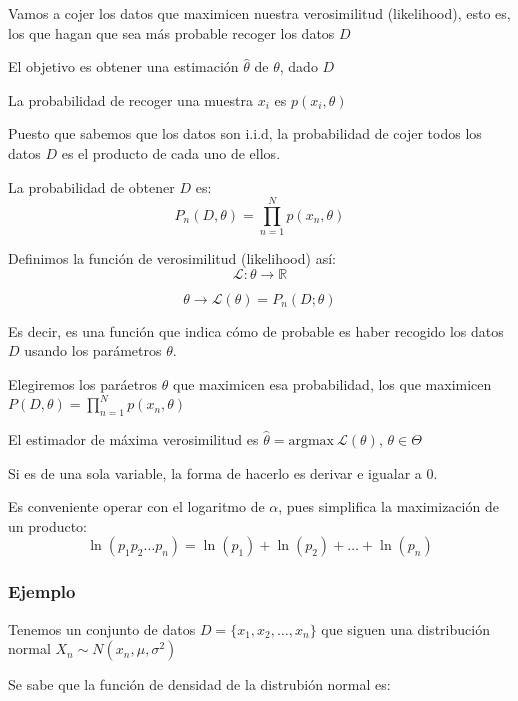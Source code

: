 \documentclass[a4paper,10pt]{article}
\begin{document}
Vamos a cojer los datos que maximicen nuestra verosimilitud (likelihood), esto es, los que hagan que sea más probable recoger los datos $D$

El objetivo es obtener una estimación $\hat{\theta}$ de $\theta$, dado $D$

La probabilidad de recoger una muestra $x_i$ es $p(x_i,\theta)$

Puesto que sabemos que los datos son i.i.d, la probabilidad de cojer todos los datos $D$ es el producto de cada uno de ellos.

La probabilidad de obtener $D$ es:
\begin{equation*}
P_n(D,\theta) = \prod_{n = 1}^{N} p(x_n,\theta)
\end{equation*}

Definimos la función de verosimilitud (likelihood) así:
\begin{equation*}
\mathcal{L} : \theta \rightarrow \mathbb{R}
\end{equation*}

\begin{equation*}
\theta \rightarrow \mathcal{L}(\theta) = P_n(D;\theta)
\end{equation*}

Es decir, es una función que indica cómo de probable es haber recogido los datos $D$ usando los parámetros $\theta$.

Elegiremos los paráetros $\theta$ que maximicen esa probabilidad, los que maximicen $P(D,\theta) = \prod_{n = 1}^{N} p(x_n,\theta)$

El estimador de máxima verosimilitud es $\hat{\theta} = \text{argmax}\  \mathcal{L}(\theta)$, $\theta \in \Theta$

Si es de una sola variable, la forma de hacerlo es derivar e igualar a 0.

Es conveniente operar con el logaritmo de $\alpha$, pues simplifica la maximización de un producto:
\begin{equation*}
\ln{(p_1p_2\dots p_n)} = \ln{(p_1)} + \ln{(p_2)} + \dots + \ln{(p_n)}
\end{equation*}

\subsubsection*{Ejemplo}
Tenemos un conjunto de datos $D = \{x_1,x_2,\dots, x_n\}$ que siguen una distribución normal $X_n \sim N(x_n,\mu, \sigma^2)$

Se sabe que la función de densidad de la distrubión normal es:
\end{document}
